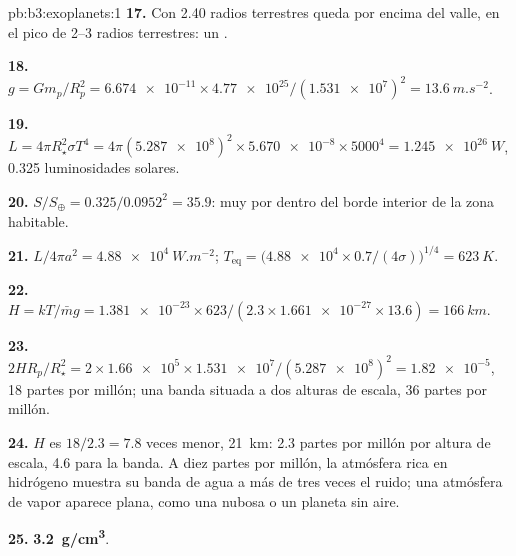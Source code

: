 \begin{solution}{pb:b3:exoplanets:1}
\textbf{17.} Con 2.40 radios terrestres queda por encima del valle, en el pico de 2--3
radios terrestres: un .

\textbf{18.} $g = Gm_p/R_p^2 = \num{6.674e-11}\times\num{4.77e25}/(\num{1.531e7})^2 =
\qty{13.6}{m.s^{-2}}$.

\textbf{19.} $L = 4\pi R_\star^2\sigma T^4 = 4\pi(\num{5.287e8})^2\times\num{5.670e-8}
\times5000^4 = \qty{1.245e26}{W}$, 0.325 luminosidades solares.

\textbf{20.} $S/S_\oplus = 0.325/0.0952^2 = 35.9$: muy por dentro del borde interior de
la zona habitable.

\textbf{21.} $L/4\pi a^2 = \qty{4.88e4}{W.m^{-2}}$; $T_\mathrm{eq} =
\bigl(\num{4.88e4}\times0.7/(4\sigma)\bigr)^{1/4} = \qty{623}{K}$.

\textbf{22.} $H = kT/\bar m g = \num{1.381e-23}\times623/(2.3\times\num{1.661e-27}
\times13.6) = \qty{166}{km}$.

\textbf{23.} $2HR_p/R_\star^2 = 2\times\num{1.66e5}\times\num{1.531e7}/
(\num{5.287e8})^2 = \num{1.82e-5}$, 18 partes por millón; una banda situada a dos
alturas de escala, 36 partes por millón.

\textbf{24.} $H$ es $18/2.3 = 7.8$ veces menor, \qty{21}{km}: 2.3 partes por
millón por altura de escala, 4.6 para la banda. A diez partes por millón, la
atmósfera rica en hidrógeno muestra su banda de agua a más de tres veces
el ruido; una atmósfera de vapor aparece plana, como una nubosa o un planeta
sin aire.

\textbf{25.} \textbf{\qty[text-series-to-math=true]{3.2}{g/cm^3}}.
\end{solution}
